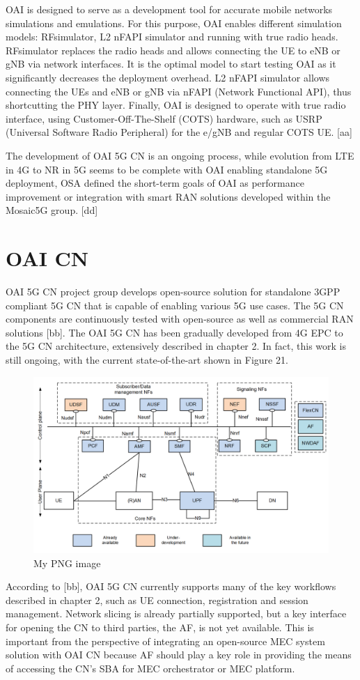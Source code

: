 \documentclass[12pt,a4paper,twoside]{report}
\begin{document}
OAI is designed to serve as a development tool for accurate mobile networks simulations and emulations. For this purpose, OAI enables different simulation models: RFsimulator, L2 nFAPI simulator and running with true radio heads. RFsimulator replaces the radio heads and allows connecting the UE to eNB or gNB via network interfaces. It is the optimal model to start testing OAI as it significantly decreases the deployment overhead. L2 nFAPI simulator allows connecting the UEs and eNB or gNB via nFAPI (Network Functional API), thus shortcutting the PHY layer. Finally, OAI is designed to operate with true radio interface, using Customer-Off-The-Shelf (COTS) hardware, such as USRP (Universal Software Radio Peripheral) for the e/gNB and regular COTS UE. [aa] 

The development of OAI 5G CN is an ongoing process, while evolution from LTE in 4G to NR in 5G seems to be complete with OAI enabling standalone 5G deployment, OSA defined the short-term goals of OAI as performance improvement or integration with smart RAN solutions developed within the Mosaic5G group. [dd]
\section{OAI CN}
OAI 5G CN project group develops open-source solution for standalone 3GPP compliant 5G CN that is capable of enabling various 5G use cases. The 5G CN components are continuously tested with open-source as well as commercial RAN solutions [bb]. The OAI 5G CN has been gradually developed from 4G EPC to the 5G CN architecture, extensively described in chapter 2. In fact, this work is still ongoing, with the current state-of-the-art shown in Figure 21.
\begin{figure}[ht]
	\centering
	\includegraphics[width=13cm]{./images/OAI-CN-soa.png} 
	\caption{My PNG image}
\end{figure}
According to [bb], OAI 5G CN currently supports many of the key workflows described in chapter 2, such as UE connection, registration and session management. Network slicing is already partially supported, but a key interface for opening the CN to third parties, the AF, is not yet available. This is important from the perspective of integrating an open-source MEC system solution with OAI CN because AF should play a key role in providing the means of accessing the CN’s SBA for MEC orchestrator or MEC platform. 
\end{document}
